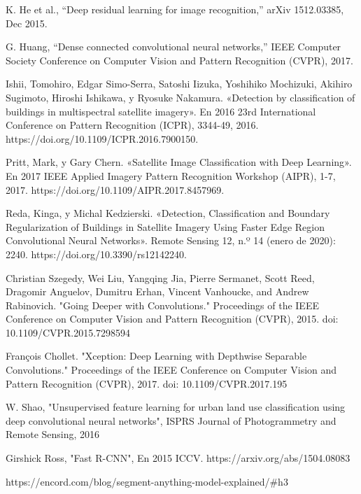 \documentclass[article]{llncs}
\begin{document}
\begin{thebibliography}{8}
        K. He et al., “Deep residual learning for image recognition,” arXiv 1512.03385, Dec 2015.
  
        G. Huang, “Dense connected convolutional neural networks,” IEEE Computer Society Conference on Computer Vision and Pattern Recognition (CVPR), 2017.
    
        Ishii, Tomohiro, Edgar Simo-Serra, Satoshi Iizuka, Yoshihiko Mochizuki, Akihiro Sugimoto, Hiroshi Ishikawa, y Ryosuke Nakamura. «Detection by classification of buildings in multispectral satellite imagery». En 2016 23rd International Conference on Pattern Recognition (ICPR), 3344-49, 2016. https://doi.org/10.1109/ICPR.2016.7900150.
    
        Pritt, Mark, y Gary Chern. «Satellite Image Classification with Deep Learning». En 2017 IEEE Applied Imagery Pattern Recognition Workshop (AIPR), 1-7, 2017. https://doi.org/10.1109/AIPR.2017.8457969.

        Reda, Kinga, y Michal Kedzierski. «Detection, Classification and Boundary Regularization of Buildings in Satellite Imagery Using Faster Edge Region Convolutional Neural Networks». Remote Sensing 12, n.º 14 (enero de 2020): 2240. https://doi.org/10.3390/rs12142240.

        Christian Szegedy, Wei Liu, Yangqing Jia, Pierre Sermanet, Scott Reed, Dragomir Anguelov, Dumitru Erhan, Vincent Vanhoucke, and Andrew Rabinovich. "Going Deeper with Convolutions." Proceedings of the IEEE Conference on Computer Vision and Pattern Recognition (CVPR), 2015. doi: 10.1109/CVPR.2015.7298594

        François Chollet. "Xception: Deep Learning with Depthwise Separable Convolutions." Proceedings of the IEEE Conference on Computer Vision and Pattern Recognition (CVPR), 2017. doi: 10.1109/CVPR.2017.195

        W. Shao, "Unsupervised feature learning for urban land use classification using deep convolutional neural networks", ISPRS Journal of Photogrammetry and Remote Sensing, 2016
        
        Girshick Ross, "Fast R-CNN", En 2015 ICCV. https://arxiv.org/abs/1504.08083
      
        https://encord.com/blog/segment-anything-model-explained/\#h3


\end{thebibliography}
\end{document}
